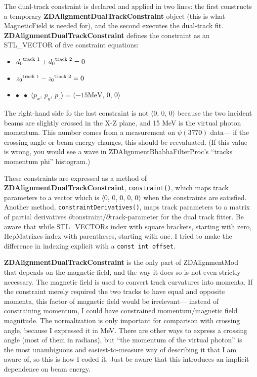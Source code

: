 \documentclass[12pt]{article}
\begin{document}
The dual-track constraint is declared and applied in two lines: the
first constructs a temporary {\bf ZDAlignmentDualTrackConstraint}
object (this is what MagneticField is needed for), and the second
executes the dual-track fit.  {\bf ZDAlignmentDualTrackConstraint}
defines the constraint as an STL\_VECTOR of five constraint equations:
\begin{itemize}

  \item $\mbox{$d_0$}^{\mbox{\scriptsize track 1}} +
         \mbox{$d_0$}^{\mbox{\scriptsize track 2}} = 0$

  \item $\mbox{$z_0$}^{\mbox{\scriptsize track 1}} -
         \mbox{$z_0$}^{\mbox{\scriptsize track 2}} = 0$

  \item $\bullet$ $\,\bullet$ $\langle p_x \mbox{, } p_y \mbox{, } p_z \rangle =
         \langle -15 \mbox{MeV, } 0 \mbox{, } 0 \rangle$

\end{itemize}
The right-hand side fo the last constraint is not $\langle$0, 0,
0$\rangle$ because the two incident beams are slightly crossed in the
X-Z plane, and 15 MeV is the virtual photon momentum.  This number
comes from a measurement on $\psi(3770)$ data--- if the crossing angle
or beam energy changes, this should be reevaluated.  (If this value is
wrong, you would see a wave in ZDAlignmentBhabhaFilterProc's ``tracks
momentum phi'' histogram.)

These constraints are expressed as a method of
{\bf ZDAlignmentDualTrackConstraint}, {\tt constraint()}, which maps
track parameters to a vector which is $\langle$0, 0, 0, 0, 0$\rangle$
when the constraints are satisfied.  Another method,
{\tt constraintDerivatives()}, maps track parameters to a matrix of
partial derivatives $\partial \mbox{constraint} / \partial
\mbox{track-parameter}$ for the dual track fitter.  Be aware that
while STL\_VECTORs index with square brackets, starting with zero,
HepMatrixes index with parentheses, starting with one.  I tried to
make the difference in indexing explicit with a {\tt const int
offset}.

{\bf ZDAlignmentDualTrackConstraint} is the only part of
ZDAlignmentMod that depends on the magnetic field, and the way it does
so is not even strictly necessary.  The magnetic field is used to
convert track curvatures into momenta.  If the constraint merely
required the two tracks to have equal and opposite momenta, this
factor of magnetic field would be irrelevant--- instead of
constraining momentum, I could have constrained momentum$/$magnetic
field magnitude.  The normalization is only important for comparison
with crossing angle, because I expressed it in MeV.  There are other
ways to express a crossing angle (most of them in radians), but ``the
momentum of the virtual photon'' is the most unambiguous and
easiest-to-measure way of describing it that I am aware of, so this is
how I coded it.  Just be aware that this introduces an implicit
dependence on beam energy.
\end{document}
